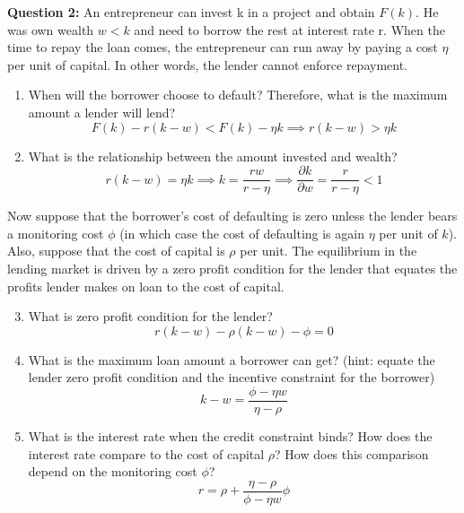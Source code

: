 \documentclass[a4paper]{article}
\begin{document}
\textbf{Question 2:} An entrepreneur can invest k in a project and obtain $F(k)$. He was own wealth $w<k$ and need to borrow the rest at interest rate r. When the time to repay the loan comes, the entrepreneur can run away by paying a cost $\eta$ per unit of capital. In other words, the lender cannot enforce repayment.
\begin{enumerate}
    \item When will the borrower choose to default? Therefore, what is the maximum amount a lender will lend?
    \[F(k)-r(k-w)<F(k)-\eta k \implies r(k-w)>\eta k \]
    \item What is the relationship between the amount invested and wealth?
    \[r(k-w)=\eta k \implies k=\frac{rw}{r-\eta} \implies \frac{\partial k}{\partial w}=\frac{r}{r-\eta}<1 \]
\end{enumerate}
Now suppose that the borrower’s cost of defaulting is zero unless the lender bears a monitoring cost $\phi$ (in which case the cost of defaulting is again $\eta$ per unit of $k$). Also, suppose that the cost of capital is $\rho$ per unit. The equilibrium in the lending market is driven by a zero profit condition for the lender that equates the profits lender makes on loan to the cost of capital.
\begin{enumerate}
    \setcounter{enumi}{2}
    \item What is zero profit condition for the lender?
    \[r(k-w)-\rho(k-w)-\phi=0 \]
    \item What is the maximum loan amount a borrower can get? (hint: equate the lender zero profit condition and the incentive constraint for the borrower)
    \[k-w=\frac{\phi-\eta w}{\eta-\rho} \]
    \item What is the interest rate when the credit constraint binds? How does the interest rate compare to the cost of capital $\rho$? How does this comparison depend on the monitoring cost $\phi$?
    \[r=\rho+\frac{\eta-\rho}{\phi-\eta w}\phi \]
\end{enumerate}
\end{document}
